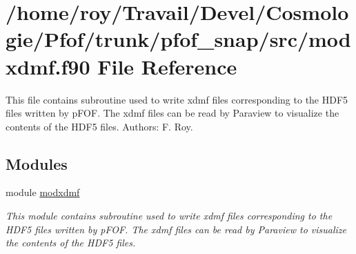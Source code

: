 \hypertarget{pfof__snap_2src_2modxdmf_8f90}{}\section{/home/roy/\+Travail/\+Devel/\+Cosmologie/\+Pfof/trunk/pfof\+\_\+snap/src/modxdmf.f90 File Reference}
\label{pfof__snap_2src_2modxdmf_8f90}


This file contains subroutine used to write xdmf files corresponding to the H\+D\+F5 files written by p\+F\+OF. The xdmf files can be read by Paraview to visualize the contents of the H\+D\+F5 files. Authors\+: F. Roy.  


\subsection*{Modules}
\begin{DoxyCompactItemize}
\item 
module \hyperlink{namespacemodxdmf}{modxdmf}
\begin{DoxyCompactList}\small\item\em This module contains subroutine used to write xdmf files corresponding to the H\+D\+F5 files written by p\+F\+OF. The xdmf files can be read by Paraview to visualize the contents of the H\+D\+F5 files. \end{DoxyCompactList}\end{DoxyCompactItemize}
